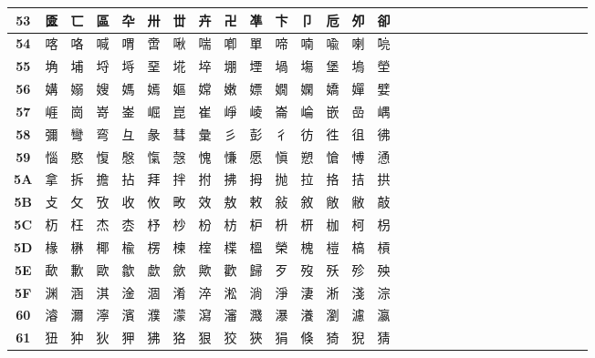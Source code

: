 \begin{table}[H]
\begin{tabular}{|Sc|Sc|Sc|Sc|Sc|Sc|Sc|Sc|Sc|Sc|Sc|Sc|Sc|Sc|Sc|}
\textbf{53} & 匳 & 匸 & 區 & 卆 & 卅 & 丗 & 卉 & 卍 & 凖 & 卞 & 卩 & 卮 & 夘 & 卻 \\ \hline
\textbf{54} & 喀 & 咯 & 喊 & 喟 & 啻 & 啾 & 喘 & 喞 & 單 & 啼 & 喃 & 喩 & 喇 & 喨 \\ \hline
\textbf{55} & 埆 & 埔 & 埒 & 埓 & 堊 & 埖 & 埣 & 堋 & 堙 & 堝 & 塲 & 堡 & 塢 & 塋 \\ \hline
\textbf{56} & 媾 & 嫋 & 嫂 & 媽 & 嫣 & 嫗 & 嫦 & 嫩 & 嫖 & 嫺 & 嫻 & 嬌 & 嬋 & 嬖 \\ \hline
\textbf{57} & 崕 & 崗 & 嵜 & 崟 & 崛 & 崑 & 崔 & 崢 & 崚 & 崙 & 崘 & 嵌 & 嵒 & 嵎 \\ \hline
\textbf{58} & 彌 & 彎 & 弯 & 彑 & 彖 & 彗 & 彙 & 彡 & 彭 & 彳 & 彷 & 徃 & 徂 & 彿 \\ \hline
\textbf{59} & 惱 & 愍 & 愎 & 慇 & 愾 & 愨 & 愧 & 慊 & 愿 & 愼 & 愬 & 愴 & 愽 & 慂 \\ \hline
\textbf{5A} & 拿 & 拆 & 擔 & 拈 & 拜 & 拌 & 拊 & 拂 & 拇 & 抛 & 拉 & 挌 & 拮 & 拱 \\ \hline
\textbf{5B} & 攴 & 攵 & 攷 & 收 & 攸 & 畋 & 效 & 敖 & 敕 & 敍 & 敘 & 敞 & 敝 & 敲 \\ \hline
\textbf{5C} & 杤 & 枉 & 杰 & 枩 & 杼 & 杪 & 枌 & 枋 & 枦 & 枡 & 枅 & 枷 & 柯 & 枴 \\ \hline
\textbf{5D} & 椽 & 楙 & 椰 & 楡 & 楞 & 楝 & 榁 & 楪 & 榲 & 榮 & 槐 & 榿 & 槁 & 槓 \\ \hline
\textbf{5E} & 歃 & 歉 & 歐 & 歙 & 歔 & 歛 & 歟 & 歡 & 歸 & 歹 & 歿 & 殀 & 殄 & 殃 \\ \hline
\textbf{5F} & 渊 & 涵 & 淇 & 淦 & 涸 & 淆 & 淬 & 淞 & 淌 & 淨 & 淒 & 淅 & 淺 & 淙 \\ \hline
\textbf{60} & 濬 & 濔 & 濘 & 濱 & 濮 & 濛 & 瀉 & 瀋 & 濺 & 瀑 & 瀁 & 瀏 & 濾 & 瀛 \\ \hline
\textbf{61} & 狃 & 狆 & 狄 & 狎 & 狒 & 狢 & 狠 & 狡 & 狹 & 狷 & 倏 & 猗 & 猊 & 猜 \\ \hline
\end{tabular}
\end{table}


